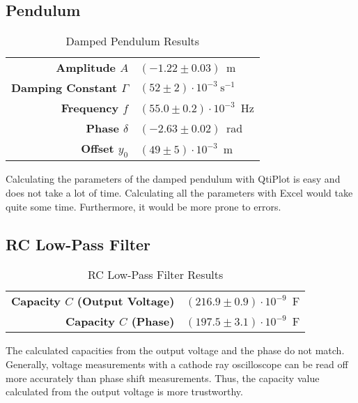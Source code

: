 \subsection{Pendulum}
\begin{table}[H]
	\centering
	\renewcommand{\arraystretch}{1.2}
	\begin{tabular}{r l}
		\hline
		\textbf{Amplitude $A$} & $(-1.22\pm0.03)$\ m \\
		\textbf{Damping Constant $\Gamma$} & $(52\pm2)\cdot10^{-3}\ \text{s}^{-1}$ \\
		\textbf{Frequency $f$} & $(55.0\pm0.2)\cdot10^{-3}$\ Hz \\
		\textbf{Phase $\delta$} & $(-2.63\pm0.02)$\ rad \\
		\textbf{Offset $y_0$} & $(49\pm5)\cdot10^{-3}$\ m \\ \hline
	\end{tabular}
	\caption{Damped Pendulum Results}
	\label{tab:Damped_Pendulum_Results}
\end{table}
Calculating the parameters of the damped pendulum with QtiPlot is easy and does not take a lot of time. Calculating all the parameters with Excel would take quite some time. Furthermore, it would be more prone to errors.
\subsection{RC Low-Pass Filter}
\begin{table}[H]
	\centering
	\renewcommand{\arraystretch}{1.2}
	\begin{tabular}{r l}
		\hline
		\textbf{Capacity $C$ (Output Voltage)} & $(216.9\pm0.9)\cdot10^{-9}$\ F \\
		\textbf{Capacity $C$ (Phase)} & $(197.5\pm3.1)\cdot10^{-9}$\ F \\ \hline
	\end{tabular}
	\caption{RC Low-Pass Filter Results}
	\label{tab:RC_Low-Pass_Filter_Results}
\end{table}
The calculated capacities from the output voltage and the phase do not match. Generally, voltage measurements with a cathode ray oscilloscope can be read off more accurately than phase shift measurements. Thus, the capacity value calculated from the output voltage is more trustworthy.
